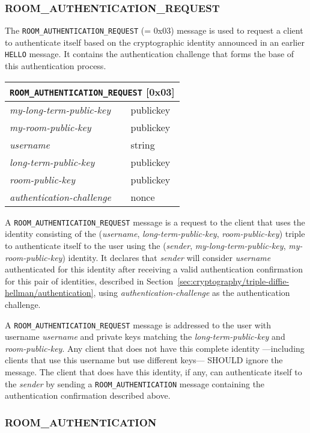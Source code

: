 \documentclass{article}
\def\npmessage#1{\texttt{#1}}
\def\field#1{\textit{#1}}
\def\type#1{\textsf{#1}}
\newenvironment{basicmessage}[2]{
\newcommand{\messagefield}[2]{
\field{##1} & \type{##2} \\
\hline
}
\hspace{2em minus 2em}\begin{tabular}{|l|l|}
\hline
\multicolumn{2}{|c|}{\npmessage{#1} [#2]} \\
\hline
\hline
}{
\end{tabular}
}
\begin{document}
\subsubsection{ROOM\_AUTHENTICATION\_REQUEST}
\label{sec:messages/room-authentication-request}

The \npmessage{ROOM\_AUTHENTICATION\_REQUEST} (= 0x03) message is used to request a client to authenticate itself based on the cryptographic identity announced in an earlier \npmessage{HELLO} message.
It contains the authentication challenge that forms the base of this authentication process.

\begin{basicmessage}{ROOM\_AUTHENTICATION\_REQUEST}{0x03}
\messagefield{my-long-term-public-key}{publickey}
\messagefield{my-room-public-key}{publickey}
\messagefield{username}{string}
\messagefield{long-term-public-key}{publickey}
\messagefield{room-public-key}{publickey}
\messagefield{authentication-challenge}{nonce}
\end{basicmessage}

A \npmessage{ROOM\_AUTHENTICATION\_REQUEST} message is a request to the client that uses the identity consisting of the (\field{username}, \field{long-term-public-key}, \field{room-public-key}) triple to authenticate itself to the user using the (\field{sender}, \field{my-long-term-public-key}, \field{my-room-public-key}) identity.
It declares that \field{sender} will consider \field{username} authenticated for this identity after receiving a valid authentication confirmation for this pair of identities, described in Section~\ref{sec:cryptography/triple-diffie-hellman/authentication}, using \field{authentication-challenge} as the authentication challenge.

A \npmessage{ROOM\_AUTHENTICATION\_REQUEST} message is addressed to the user with username \field{username} and private keys matching the \field{long-term-public-key} and \field{room-public-key}.
Any client that does not have this complete identity ---including clients that use this username but use different keys--- SHOULD ignore the message.
The client that does have this identity, if any, can authenticate itself to the \field{sender} by sending a \npmessage{ROOM\_AUTHENTICATION} message containing the authentication confirmation described above.


\subsubsection{ROOM\_AUTHENTICATION}
\label{sec:messages/room-authentication}
\end{document}

